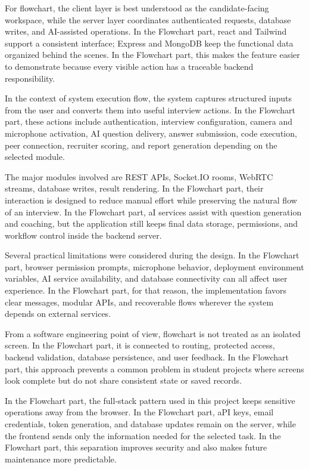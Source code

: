 \documentclass[12pt,a4paper]{report}
\begin{document}
For flowchart, the client layer is best understood as the candidate-facing workspace, while the server layer coordinates authenticated requests, database writes, and AI-assisted operations. In the Flowchart part, react and Tailwind support a consistent interface; Express and MongoDB keep the functional data organized behind the scenes. In the Flowchart part, this makes the feature easier to demonstrate because every visible action has a traceable backend responsibility.


In the context of system execution flow, the system captures structured inputs from the user and converts them into useful interview actions. In the Flowchart part, these actions include authentication, interview configuration, camera and microphone activation, AI question delivery, answer submission, code execution, peer connection, recruiter scoring, and report generation depending on the selected module.


The major modules involved are REST APIs, Socket.IO rooms, WebRTC streams, database writes, result rendering. In the Flowchart part, their interaction is designed to reduce manual effort while preserving the natural flow of an interview. In the Flowchart part, aI services assist with question generation and coaching, but the application still keeps final data storage, permissions, and workflow control inside the backend server.


Several practical limitations were considered during the design. In the Flowchart part, browser permission prompts, microphone behavior, deployment environment variables, AI service availability, and database connectivity can all affect user experience. In the Flowchart part, for that reason, the implementation favors clear messages, modular APIs, and recoverable flows wherever the system depends on external services.


From a software engineering point of view, flowchart is not treated as an isolated screen. In the Flowchart part, it is connected to routing, protected access, backend validation, database persistence, and user feedback. In the Flowchart part, this approach prevents a common problem in student projects where screens look complete but do not share consistent state or saved records.


In the Flowchart part, the full-stack pattern used in this project keeps sensitive operations away from the browser. In the Flowchart part, aPI keys, email credentials, token generation, and database updates remain on the server, while the frontend sends only the information needed for the selected task. In the Flowchart part, this separation improves security and also makes future maintenance more predictable.
\end{document}
